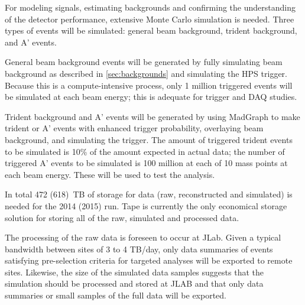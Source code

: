 For modeling signals, estimating backgrounds and confirming the understanding of the detector 
performance, extensive Monte Carlo simulation is needed. 
Three types of events will be simulated: general beam background, trident background, and A' events.

General beam background events will be generated by fully simulating beam background as described in \ref{sec:backgrounds} and simulating the HPS trigger. 
Because this is a compute-intensive process, only 1 million triggered events will be simulated at each beam energy; this is adequate for trigger and DAQ studies.

Trident background and A' events will be generated by using MadGraph to make trident or A' events 
with enhanced trigger probability, overlaying beam background, and simulating the trigger.
The amount of triggered trident events to be simulated is 10\% of the amount expected in actual data; 
the number of triggered A' events to be simulated is 100 million at each of 10 mass points at each beam energy. 
These will be used to test the analysis.

In total 472 (618)~TB of storage for data (raw, reconstructed and simulated) is needed for the 2014 (2015) run.
Tape is currently the only economical storage
solution for storing all of the raw, simulated and processed data.

The processing of the raw data is foreseen to occur at JLab. Given a
typical bandwidth between sites of 3 to 4 TB/day, 
only data summaries of events satisfying
pre-selection criteria for targeted analyses will be exported to remote
sites. Likewise, the size of the simulated data samples suggests that
the simulation should be processed and stored at JLAB and that 
only data summaries or small samples of the full data will be
exported.

